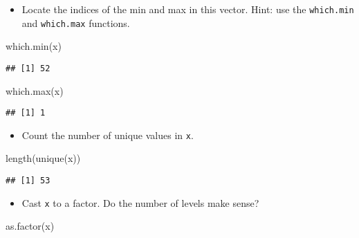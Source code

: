 \documentclass[
]{article}
\newenvironment{Shaded}{\begin{snugshade}}{\end{snugshade}}
\newcommand{\FunctionTok}[1]{\textcolor[rgb]{0.00,0.00,0.00}{#1}}
\newcommand{\NormalTok}[1]{#1}
\providecommand{\tightlist}{%
  \setlength{\itemsep}{0pt}\setlength{\parskip}{0pt}}
\begin{document}
\begin{itemize}
\tightlist
\item
  Locate the indices of the min and max in this vector. Hint: use the
  \texttt{which.min} and \texttt{which.max} functions.
\end{itemize}

\begin{Shaded}
\begin{Highlighting}[]
\FunctionTok{which.min}\NormalTok{(x)}
\end{Highlighting}
\end{Shaded}

\begin{verbatim}
## [1] 52
\end{verbatim}

\begin{Shaded}
\begin{Highlighting}[]
\FunctionTok{which.max}\NormalTok{(x)}
\end{Highlighting}
\end{Shaded}

\begin{verbatim}
## [1] 1
\end{verbatim}

\begin{itemize}
\tightlist
\item
  Count the number of unique values in \texttt{x}.
\end{itemize}

\begin{Shaded}
\begin{Highlighting}[]
\FunctionTok{length}\NormalTok{(}\FunctionTok{unique}\NormalTok{(x))}
\end{Highlighting}
\end{Shaded}

\begin{verbatim}
## [1] 53
\end{verbatim}

\begin{itemize}
\tightlist
\item
  Cast \texttt{x} to a factor. Do the number of levels make sense?
\end{itemize}

\begin{Shaded}
\begin{Highlighting}[]
\FunctionTok{as.factor}\NormalTok{(x)}
\end{Highlighting}
\end{Shaded}
\end{document}
